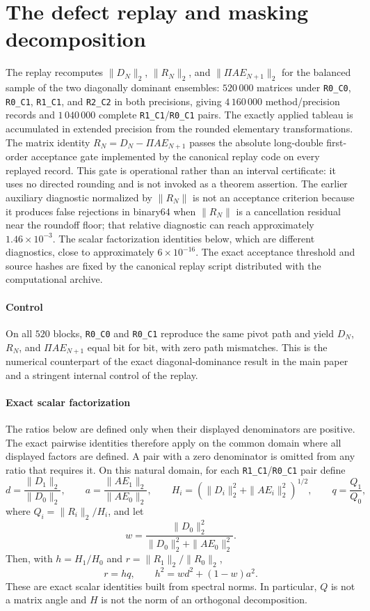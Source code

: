 \documentclass[supplement,review,onefignum,onetabnum]{siamart251216}
\begin{document}
\section{The defect replay and masking decomposition}
\label{sm:replay}

The replay recomputes $\|D_N\|_2$, $\|R_N\|_2$, and $\|\Pi AE_{N+1}\|_2$ for the balanced sample
of the two diagonally dominant ensembles: $520\,000$ matrices under \texttt{R0\_C0},
\texttt{R0\_C1}, \texttt{R1\_C1}, and \texttt{R2\_C2} in both precisions, giving
$4\,160\,000$ method/precision records and $1\,040\,000$ complete
\texttt{R1\_C1}/\texttt{R0\_C1} pairs. The exactly applied tableau is accumulated in extended
precision from the rounded elementary transformations. The matrix identity
$R_N=D_N-\Pi AE_{N+1}$ passes the absolute long-double first-order acceptance gate implemented by
the canonical replay code on every replayed record. This gate is operational rather than an
interval certificate: it uses no directed rounding and is not invoked as a theorem assertion. The
earlier auxiliary diagnostic normalized by $\|R_N\|$ is not an acceptance criterion because it
produces false rejections in binary64 when $\|R_N\|$ is a cancellation residual near the roundoff
floor; that relative diagnostic can reach approximately $1.46\times10^{-3}$. The scalar
factorization identities below, which are different diagnostics, close to approximately
$6\times10^{-16}$. The exact acceptance threshold and source hashes are fixed by the canonical
replay script distributed with the computational archive.

\paragraph{Control}
On all $520$ blocks, \texttt{R0\_C0} and \texttt{R0\_C1} reproduce the same pivot path and yield
$D_N$, $R_N$, and $\Pi AE_{N+1}$ equal bit for bit, with zero path mismatches. This is the numerical
counterpart of the exact diagonal-dominance result in the main paper and a stringent internal
control of the replay.

\paragraph{Exact scalar factorization}
The ratios below are defined only when their displayed denominators are positive.  The exact
pairwise identities therefore apply on the common domain where all displayed factors are defined.
A pair with a zero denominator is omitted from any ratio that requires it. On this natural domain,
for each \texttt{R1\_C1}/\texttt{R0\_C1} pair define
%
\[
d=\frac{\|D_1\|_2}{\|D_0\|_2},
\qquad
a=\frac{\|AE_1\|_2}{\|AE_0\|_2},
\qquad
H_i=(\|D_i\|_2^2+\|AE_i\|_2^2)^{1/2},
\qquad
q=\frac{Q_1}{Q_0},
\]
%
where $Q_i=\|R_i\|_2/H_i$, and let
%
\[
w=\frac{\|D_0\|_2^2}{\|D_0\|_2^2+\|AE_0\|_2^2}.
\]
%
Then, with $h=H_1/H_0$ and $r=\|R_1\|_2/\|R_0\|_2$,
%
\[
r=hq,
\qquad
h^2=wd^2+(1-w)a^2.
\]
%
These are exact scalar identities built from spectral norms. In particular, $Q$ is not a matrix
angle and $H$ is not the norm of an orthogonal decomposition.
\end{document}

